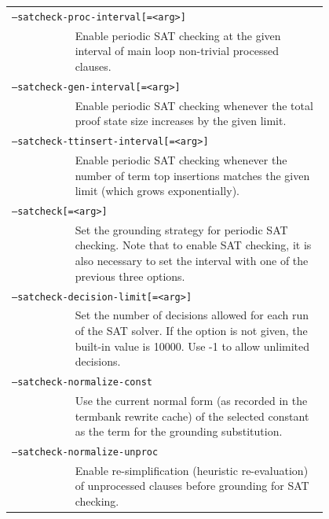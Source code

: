 \documentclass{report}
\begin{document}
\begin{tabular}{lp{0.8\linewidth}}
  \multicolumn{2}{l}{\texttt{--satcheck-proc-interval[=<arg>]}\index{SAT checking}\index{satcheck-proc-interval@\texttt{--satcheck-proc-interval}}} \\
  & Enable periodic SAT checking at the given interval of main loop
    non-trivial processed clauses.\\
  \multicolumn{2}{l}{\texttt{--satcheck-gen-interval[=<arg>]}\index{satcheck-gen-interval@\texttt{--satcheck-gen-interval}}} \\
  & Enable periodic SAT checking whenever the total proof state size
    increases by the given limit. \\
  \multicolumn{2}{l}{\texttt{--satcheck-ttinsert-interval[=<arg>]}\index{satcheck-ttinsert-interval@\texttt{--satcheck-ttinsert-interval}}}\\
  & Enable periodic SAT checking whenever the number of term top insertions
    matches the given limit (which grows exponentially).\\
  \multicolumn{2}{l}{\texttt{--satcheck[=<arg>]}\index{satcheck@\texttt{--satcheck}}}\\
  & Set the grounding strategy for periodic SAT checking. Note that to enable
    SAT checking, it is also necessary to set the interval with one of the
    previous three options. \\
  \multicolumn{2}{l}{\texttt{--satcheck-decision-limit[=<arg>]}\index{satcheck-decision-limit@\texttt{--satcheck-decision-limit}}}\\
  & Set the number of decisions allowed for each run of the SAT solver. If
    the option is not given, the built-in value is 10000. Use -1 to allow
    unlimited decisions. \\
  \multicolumn{2}{l}{\texttt{--satcheck-normalize-const}\index{satcheck-normalize-const@\texttt{--satcheck-normalize-const}}}\\
  & Use the current normal form (as recorded in the termbank rewrite cache)
    of the selected constant as the term for the grounding substitution.\\
  \multicolumn{2}{l}{\texttt{--satcheck-normalize-unproc}\index{satcheck-normalize-unproc@\texttt{--satcheck-normalize-unproc}}}\\
  & Enable re-simplification (heuristic re-evaluation) of unprocessed
    clauses before grounding for SAT checking.\\
\end{tabular}
\end{document}
